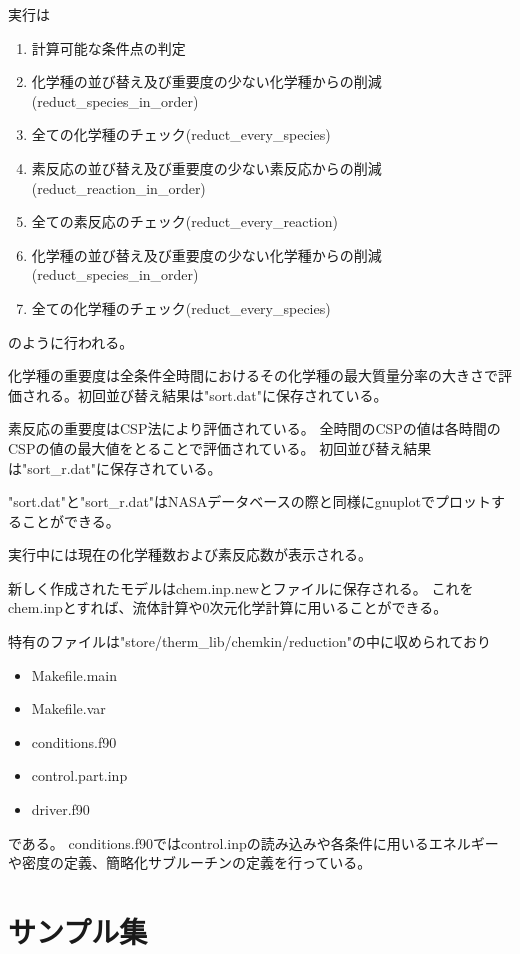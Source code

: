 \documentclass{jsarticle}
\begin{document}
実行は
\begin{enumerate}
\item 計算可能な条件点の判定
\item 化学種の並び替え及び重要度の少ない化学種からの削減(reduct\_species\_in\_order)
\item 全ての化学種のチェック(reduct\_every\_species)
\item 素反応の並び替え及び重要度の少ない素反応からの削減(reduct\_reaction\_in\_order)
\item 全ての素反応のチェック(reduct\_every\_reaction)
\item 化学種の並び替え及び重要度の少ない化学種からの削減(reduct\_species\_in\_order)
\item 全ての化学種のチェック(reduct\_every\_species)
\end{enumerate}
のように行われる。

化学種の重要度は全条件全時間におけるその化学種の最大質量分率の大きさで評価される。初回並び替え結果は"sort.dat"に保存されている。

素反応の重要度はCSP法により評価されている。
全時間のCSPの値は各時間のCSPの値の最大値をとることで評価されている。
初回並び替え結果は"sort\_r.dat"に保存されている。

"sort.dat"と"sort\_r.dat"はNASAデータベースの際と同様にgnuplotでプロットすることができる。

実行中には現在の化学種数および素反応数が表示される。

新しく作成されたモデルはchem.inp.newとファイルに保存される。
これをchem.inpとすれば、流体計算や0次元化学計算に用いることができる。

\hspace{1em}

特有のファイルは"store/therm\_lib/chemkin/reduction"の中に収められており
\begin{itemize}
\item Makefile.main
\item Makefile.var
\item conditions.f90
\item control.part.inp
\item driver.f90
\end{itemize}
である。
conditions.f90ではcontrol.inpの読み込みや各条件に用いるエネルギーや密度の定義、簡略化サブルーチンの定義を行っている。
\newpage

\part{サンプル集}
\newpage
\end{document}
